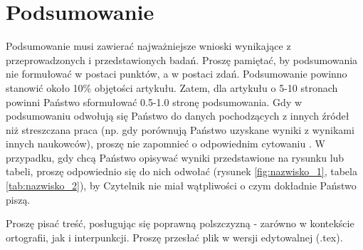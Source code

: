 \section{Podsumowanie}
Podsumowanie musi zawierać najważniejsze wnioski wynikające z przeprowadzonych i przedstawionych badań. Proszę pamiętać, by podsumowania nie formułować w postaci punktów, a w postaci zdań. Podsumowanie powinno stanowić około 10\% objętości artykułu. Zatem, dla artykułu o 5-10 stronach powinni Państwo sformułować 0.5-1.0 stronę podsumowania. Gdy w podsumowaniu odwołują się Państwo do danych pochodzących z innych źródeł niż streszczana praca (np. gdy porównują Państwo uzyskane wyniki z wynikami innych naukowców), proszę nie zapomnieć o odpowiednim cytowaniu \cite{poz3}. W przypadku, gdy chcą Państwo opisywać wyniki przedstawione na rysunku lub tabeli, proszę odpowiednio się do nich odwołać (rysunek \ref{fig:nazwisko_1}, tabela \ref{tab:nazwisko_2}), by Czytelnik nie miał wątpliwości o czym dokładnie Państwo piszą.

Proszę pisać treść, posługując się poprawną polszczyzną - zarówno w kontekście ortografii, jak i interpunkcji.
Proszę przesłać plik w wersji edytowalnej (.tex).

